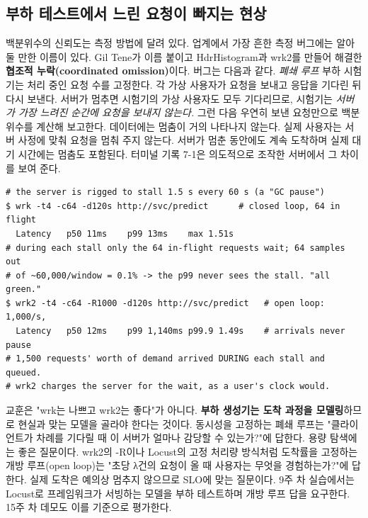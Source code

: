 \subsection*{부하 테스트에서 느린 요청이 빠지는 현상}

백분위수의 신뢰도는 측정 방법에 달려 있다. 업계에서 가장 흔한 측정 버그에는 알아 둘 만한 이름이 있다. Gil Tene가 이름 붙이고 HdrHistogram과 wrk2를 만들어 해결한 \textbf{협조적 누락(coordinated omission)}이다. 버그는 다음과 같다. \textit{폐쇄 루프} 부하 시험기는 처리 중인 요청 수를 고정한다. 각 가상 사용자가 요청을 보내고 응답을 기다린 뒤 다시 보낸다. 서버가 멈추면 시험기의 가상 사용자도 모두 기다리므로, 시험기는 \textit{서버가 가장 느려진 순간에 요청을 보내지 않는다.} 그런 다음 우연히 보낸 요청만으로 백분위수를 계산해 보고한다. 데이터에는 멈춤이 거의 나타나지 않는다. 실제 사용자는 서버 사정에 맞춰 요청을 멈춰 주지 않는다. 서버가 멈춘 동안에도 계속 도착하며 실제 대기 시간에는 멈춤도 포함된다. 터미널 기록 7-1은 의도적으로 조작한 서버에서 그 차이를 보여 준다.

\begin{terminalbox}
\begin{Verbatim}[breaklines=true,breakanywhere=true,fontsize=\small,formatcom=\color{tbbtermfg},codes=\tbbcodeactive]
# the server is rigged to stall 1.5 s every 60 s (a "GC pause")
$ wrk -t4 -c64 -d120s http://svc/predict      # closed loop, 64 in flight
  Latency   p50 11ms    p99 13ms    max 1.51s
# during each stall only the 64 in-flight requests wait; 64 samples out
# of ~60,000/window = 0.1% -> the p99 never sees the stall. "all green."
$ wrk2 -t4 -c64 -R1000 -d120s http://svc/predict   # open loop: 1,000/s,
  Latency   p50 12ms    p99 1,140ms p99.9 1.49s    # arrivals never pause
# 1,500 requests' worth of demand arrived DURING each stall and queued.
# wrk2 charges the server for the wait, as a user's clock would.
\end{Verbatim}
\end{terminalbox}

교훈은 "wrk는 나쁘고 wrk2는 좋다"가 아니다. \textbf{부하 생성기는 도착 과정을 모델링}하므로 현실과 맞는 모델을 골라야 한다는 것이다. 동시성을 고정하는 폐쇄 루프는 "클라이언트가 차례를 기다릴 때 이 서버가 얼마나 감당할 수 있는가?"에 답한다. 용량 탐색에는 좋은 질문이다. wrk2의 -R이나 Locust의 고정 처리량 방식처럼 도착률을 고정하는 개방 루프(open loop)는 "초당 λ건의 요청이 올 때 사용자는 무엇을 경험하는가?"에 답한다. 실제 도착은 예의상 멈추지 않으므로 SLO에 맞는 질문이다. 9주 차 실습에서는 Locust로 프레임워크가 서빙하는 모델을 부하 테스트하며 개방 루프 답을 요구한다. 15주 차 데모도 이를 기준으로 평가한다.

